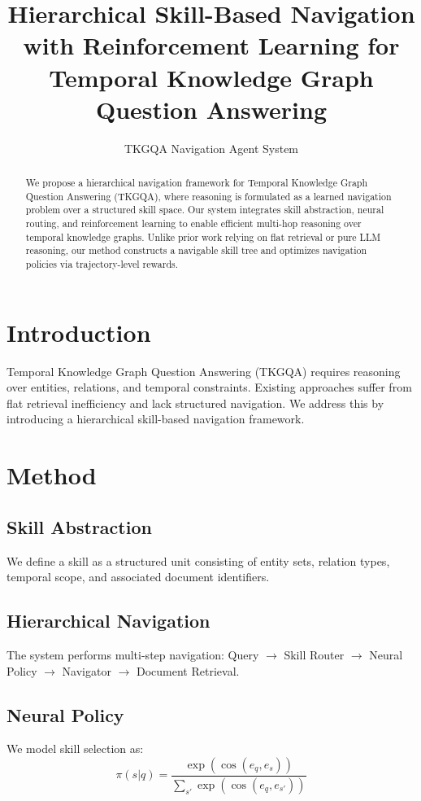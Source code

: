 \documentclass{article}
\title{Hierarchical Skill-Based Navigation with Reinforcement Learning for Temporal Knowledge Graph Question Answering}
\author{TKGQA Navigation Agent System}
\date{}
\begin{document}
\maketitle

\begin{abstract}
We propose a hierarchical navigation framework for Temporal Knowledge Graph Question Answering (TKGQA), where reasoning is formulated as a learned navigation problem over a structured skill space. Our system integrates skill abstraction, neural routing, and reinforcement learning to enable efficient multi-hop reasoning over temporal knowledge graphs. Unlike prior work relying on flat retrieval or pure LLM reasoning, our method constructs a navigable skill tree and optimizes navigation policies via trajectory-level rewards.
\end{abstract}

\section{Introduction}
Temporal Knowledge Graph Question Answering (TKGQA) requires reasoning over entities, relations, and temporal constraints. Existing approaches suffer from flat retrieval inefficiency and lack structured navigation. We address this by introducing a hierarchical skill-based navigation framework.

\section{Method}

\subsection{Skill Abstraction}
We define a skill as a structured unit consisting of entity sets, relation types, temporal scope, and associated document identifiers.

\subsection{Hierarchical Navigation}
The system performs multi-step navigation:
Query $\rightarrow$ Skill Router $\rightarrow$ Neural Policy $\rightarrow$ Navigator $\rightarrow$ Document Retrieval.

\subsection{Neural Policy}
We model skill selection as:
\begin{equation}
\pi(s|q) = \frac{\exp(\cos(e_q, e_s))}{\sum_{s'} \exp(\cos(e_q, e_{s'}))}
\end{equation}
\end{document}
